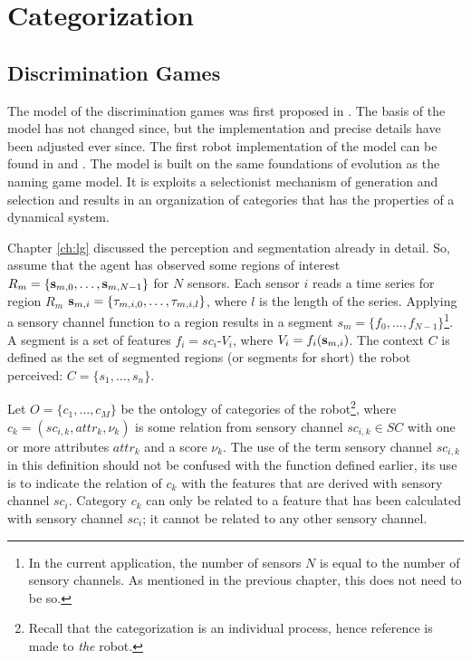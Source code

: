 \section{Categorization}\label{s:cm:dg}

\subsection{Discrimination Games}

The model of the discrimination games was first proposed in \cite{steels:1996b}. The basis of the model has not changed since, but the implementation and precise details have been adjusted ever since. The first robot implementation of the model can be found in \cite{steelsvogt:1997} and \cite{vogt:1998a}. The model is built on the same foundations of evolution as the naming game model. It is exploits a selectionist mechanism of generation and selection and results in an organization of categories that has the properties of a dynamical system.


\p
Chapter \ref{ch:lg} discussed the perception and segmentation already in detail. So, assume that the agent has observed some regions of interest $R_m=\{{\bf s}_{m,0},\ldots,{\bf s}_{m,N-1}\}$ for $N$ sensors. Each sensor $i$ reads a time series for region $R_m$ ${\bf s}_{m,i}=\{\tau_{m,i,0},\ldots,\tau_{m,i,l}\}$, where $l$ is the length of the series. Applying a sensory channel function to a region results in a segment $s_m=\{f_0,\ldots,f_{N-1}\}$\footnote{In the current application, the number of sensors $N$ is equal to the number of sensory channels. As mentioned in the previous chapter, this does not need to be so.}. A segment is a set of features $f_i=sc_i$-$V_i$, where $V_i=f_i({\bf s}_{m,i})$. The context $C$ is defined as the set of segmented regions (or segments for short) the robot perceived: $C=\{s_1,\ldots,s_n\}$.


\p
{}Let $O=\{c_1,\ldots,c_M\}$ be the ontology of categories of the robot\footnote{Recall that the categorization is an individual process, hence reference is made to {\em the} robot.}, where $c_k=(sc_{i,k},attr_k,\nu_k)$ is some relation from sensory channel $sc_{i,k} \in SC$ with one or more attributes $attr_k$ and a score $\nu_k$. The use of the term sensory channel $sc_{i,k}$ in this definition should not be confused with the function defined earlier, its use is to indicate the relation of $c_k$ with the features that are derived with sensory channel $sc_i$. Category $c_k$ can only be related to a feature that has been calculated with sensory channel $sc_i$; it cannot be related to any other sensory channel. 

